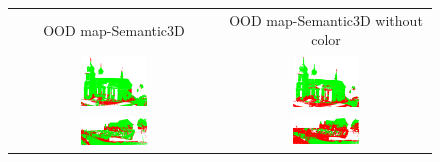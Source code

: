     \begin{figure}[h!]
        \centering
        \begin{tabular}{cc}
            OOD map-Semantic3D & OOD map-Semantic3D without color \\
            \includegraphics[width=0.33\textwidth, height=0.18\textheight]{images/ood_imgs/sem3d_of/ent/de_sem3d_OOD_1.pdf}&
            \includegraphics[width=0.33\textwidth, height=0.18\textheight]{images/ood_imgs/sem3d_of/ent/de_sem3d_of_OOD_1.pdf}\\

            \includegraphics[width=0.33\textwidth, height=0.18\textheight]{images/ood_imgs/sem3d_of/ent/de_sem3d_OOD_2.pdf}&
            \includegraphics[width=0.33\textwidth, height=0.18\textheight]{images/ood_imgs/sem3d_of/ent/de_sem3d_of_OOD_2.pdf}\\


\end{tabular}
\end{figure}
